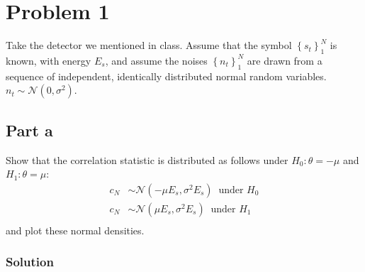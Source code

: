 \documentclass[a4paper]{article}
\begin{document}
\section*{Problem 1}%
Take the detector we mentioned in class. Assume that the symbol $\left\{ s_t \right\}_1^N$ is known, with energy $E_s$, and assume the noises $\left\{ n_t \right\}_1^N$ are drawn from a sequence of independent, identically distributed normal random variables. $n_t \sim \mathcal{N}(0, \sigma^2)$.

\subsection*{Part a}%
Show that the correlation statistic is distributed as follows under $H_0: \theta = -\mu$ and $H_1: \theta = \mu$:
\[
  \begin{aligned}
    c_N &\sim \mathcal{N}(-\mu E_s, \sigma^2 E_s) \ \text{ under } H_0 \\ 
    c_N &\sim \mathcal{N}(\mu E_s, \sigma^2 E_s) \ \text{ under } H_1 \\ 
  \end{aligned}
\]
and plot these normal densities.

\subsubsection*{Solution}%
\end{document}
